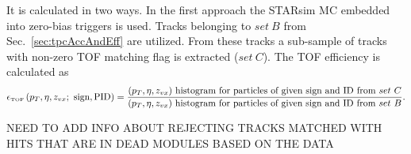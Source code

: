 It is calculated in two ways. In the first approach the STARsim MC embedded into zero-bias triggers is used. Tracks belonging to $set~B$ from Sec.~\ref{sec:tpcAccAndEff} are utilized. From these tracks a sub-sample of tracks with non-zero TOF matching flag is extracted ($set~C$). The TOF efficiency is calculated as
\begin{equation}\label{eq:tofAccAndEffDefinition}
		\epsilon_{\textrm{\tiny TOF}}\left(p_{T}, \eta, z_{vx};~\textrm{sign},\textrm{PID}\right) = \frac{(p_{T},\eta, z_{vx})~\textrm{histogram for particles of given sign and ID from}~set~C}{(p_{T},\eta, z_{vx})~\textrm{histogram for particles of given sign and ID from}~set~B}.
	\end{equation}

NEED TO ADD INFO ABOUT REJECTING TRACKS MATCHED WITH HITS THAT ARE IN DEAD MODULES BASED ON THE DATA

